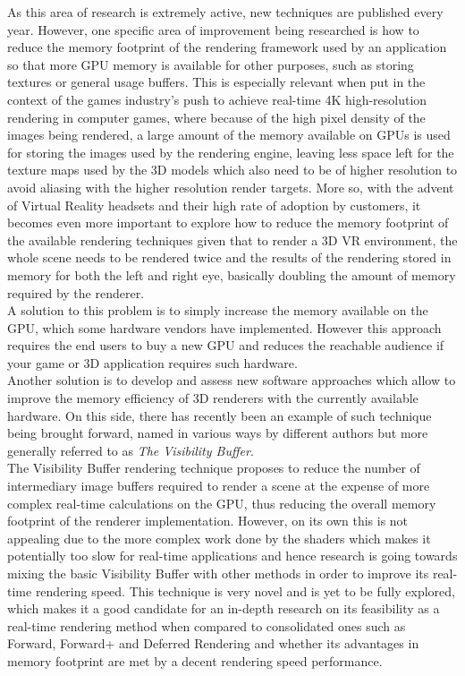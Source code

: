 As this area of research is extremely active, new techniques are
published every year. However, one specific area of improvement being
researched is how to reduce
the memory footprint of the rendering framework used by an application so
that more GPU
memory is available for other purposes, such as storing textures or general
usage buffers.
This is especially relevant when put in the context of the games industry's
push to
achieve real-time 4K high-resolution rendering in computer games, where
because of the high pixel density of the images being rendered, a large amount
of the memory available on GPUs is used for storing the images used by
the rendering engine, leaving less space left for the texture maps used by the
3D models which also need to be of higher resolution to avoid aliasing with the
higher resolution render targets.
More so, with the advent of Virtual Reality headsets and their high rate of
adoption by customers, it becomes even more important to explore how to
reduce the memory footprint of the available rendering techniques given that
to render a 3D VR environment, the whole scene needs to be rendered twice and
the
results of the rendering stored in memory for both the left and right eye,
basically doubling the amount of memory required by the renderer.\\

A solution to this problem is to simply increase the memory available on the
GPU, which some hardware vendors have implemented. However this approach
requires the end users to buy a new GPU and reduces the reachable audience
if your game or 3D application requires such hardware.\\

Another solution is to develop and 
assess new software approaches which allow to improve the memory efficiency of
3D renderers with the currently available hardware. On this side,
there has recently been an example of such technique being brought forward,
named in various ways by different authors but more generally referred to as
\emph{The Visibility Buffer}.\\
The Visibility Buffer rendering technique proposes to reduce the number of
intermediary image buffers required to render a scene at the expense of more
complex real-time calculations on the GPU, thus reducing the overall memory
footprint of the renderer implementation.
However, on its own this is not appealing due to the more complex work
done by the shaders which makes it potentially too slow for real-time
applications and hence research is going towards mixing the basic
Visibility Buffer with other methods in order to improve its real-time 
rendering speed.
This technique is very novel and is yet to be fully explored, which
makes it a good candidate for an in-depth research on its feasibility as a
real-time rendering method when compared to consolidated ones such as
Forward, Forward+ and Deferred Rendering and whether its advantages in memory
footprint are met by a decent rendering speed performance.\\

